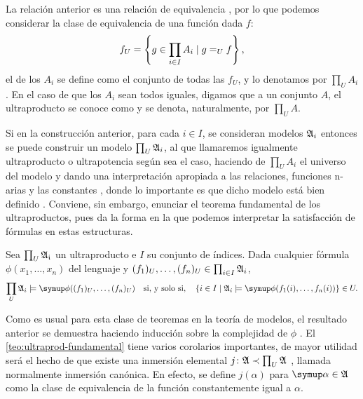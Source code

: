 La relación anterior es una relación de equivalencia \autocite[Proposición 4.1.5]{chang_model_2012},
por lo que podemos considerar la clase de equivalencia de una función dada $f$:
\[
    f_U = \left\{ g\in \prod_{i\in I} A_i\mid g=_U f \right\},
\]
el  de los $A_i$ se define como el conjunto de todas las $f_U$,
y lo denotamos por $\prod_U A_i$. En el caso de que los $A_i$ sean todos iguales, digamos que
a un conjunto $A$, el ultraproducto se conoce como  y se denota, naturalmente,
por $\prod_U A$.

Si en la construcción anterior, para cada $i\in I$, se consideran modelos $\mathfrak { A }_i$ entonces
se puede construir un modelo $\prod_U \mathfrak { A }_i$, al que llamaremos igualmente
ultraproducto o ultrapotencia según sea el caso,
haciendo de $\prod_U A_i$ el universo del modelo y dando una
interpretación apropiada a las relaciones,
funciones n-arias y las constantes \autocite[Definición 4.1.6]{chang_model_2012}, donde lo importante es que
dicho modelo está bien definido \autocite[Proposición 4.1.7]{chang_model_2012}. Conviene, sin embargo, enunciar el teorema fundamental de los
ultraproductos, pues da la forma en la que podemos interpretar la satisfacción de fórmulas
en estas estructuras.
\begin{teo}\label{teo:ultraprod-fundamental}
    Sea $\prod_U \mathfrak { A_i }$ un ultraproducto e $I$ su conjunto de índices.
    Dada cualquier fórmula $\phi(x_1,\dots,x_n)$ del lenguaje y $(f_1)_U,\dots,(f_n)_U\in\prod_{i\in I} \mathfrak { A }_i$,
    \[
        \prod_U \model{A}_i\models\phi((f_1)_U,\dots,(f_n)_U)
        \quad\text{si, y solo si,}\quad
        \set{i\in I\mid \model{A}_i\models\phi(f_1(i),\dots,f_n(i))}\in U.
    \]
\end{teo}

Como es usual para esta clase de teoremas en la teoría de modelos,
el resultado anterior se demuestra haciendo inducción sobre la complejidad
de $\phi$ \autocite[Teorema 4.1.9]{chang_model_2012}.
El \cref{teo:ultraprod-fundamental} tiene varios corolarios importantes, de mayor
utilidad será el hecho de que existe una inmersión elemental
$j\colon \mathfrak { A }\prec\prod_U\mathfrak { A }$ \autocite[Corolario 4.1.13]{chang_model_2012},
llamada normalmente inmersión canónica.
En efecto, se define $j(\alpha)$
para $\alpha\in\model{A}$ como la clase de equivalencia de la función constantemente
igual a $\alpha$.


